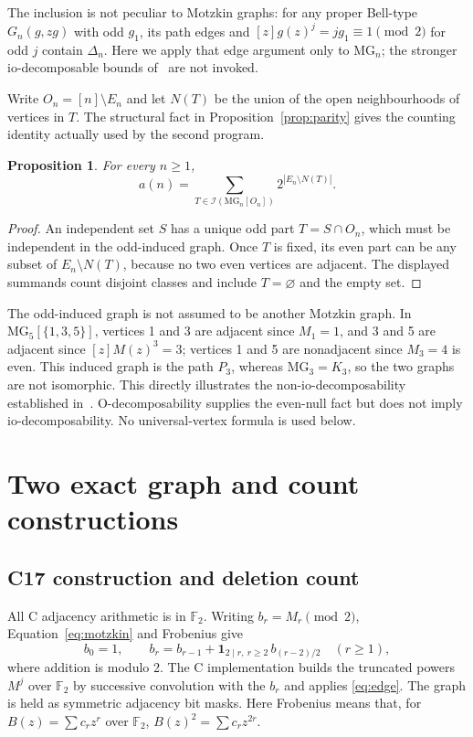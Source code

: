 \documentclass[11pt,a4paper]{article}
\newtheorem{proposition}{Proposition}[section]
\newcommand{\MG}{\mathrm{MG}}
\newcommand{\IS}{\mathcal{I}}
\begin{document}
The inclusion is not peculiar to Motzkin graphs: for any proper Bell-type
$G_n(g,zg)$ with odd $g_1$, its path edges and
$[z]g(z)^j=jg_1\equiv1\pmod{2}$ for odd $j$ contain $\Delta_n$.
Here we apply that edge argument only to $\MG_n$; the stronger
io-decomposable bounds of~\cite{counting} are not invoked.

Write $O_n=[n]\setminus E_n$ and let $N(T)$ be the union of the open
neighbourhoods of vertices in $T$.  The structural fact in
Proposition~\ref{prop:parity} gives the counting identity actually used by
the second program.
\begin{proposition}\label{prop:weighted}
For every $n\geq1$,
\begin{equation}\label{eq:weighted}
 a(n)=\sum_{T\in\IS(\MG_n[O_n])}
 2^{|E_n\setminus N(T)|}.
\end{equation}
\end{proposition}
\begin{proof}
An independent set $S$ has a unique odd part $T=S\cap O_n$, which must be
independent in the odd-induced graph.  Once $T$ is fixed, its even part can
be any subset of $E_n\setminus N(T)$, because no two even vertices are
adjacent.  The displayed summands count disjoint classes and include
$T=\varnothing$ and the empty set.
\end{proof}

The odd-induced graph is not assumed to be another Motzkin graph.
In $\MG_5[\{1,3,5\}]$, vertices 1 and 3 are adjacent since $M_1=1$,
and 3 and 5 are adjacent since $[z]M(z)^3=3$; vertices 1 and 5 are
nonadjacent since $M_3=4$ is even.  This induced graph is the path $P_3$,
whereas $\MG_3=K_3$, so the two graphs are not isomorphic.  This
directly illustrates the non-io-decomposability established
in~\cite[Example~4.8]{structure}.  O-decomposability supplies the
even-null fact but does not imply io-decomposability.  No
universal-vertex formula is used below.

\section{Two exact graph and count constructions}\label{sec:alg}
\subsection{C17 construction and deletion count}
All C adjacency arithmetic is in $\mathbb F_2$.  Writing
$b_r=M_r\pmod{2}$, Equation~\eqref{eq:motzkin} and Frobenius give
\begin{equation}\label{eq:parityrec}
 b_0=1,\qquad
 b_r=b_{r-1}+\mathbf1_{2\mid r,\ r\geq2}\,b_{(r-2)/2}
 \quad(r\geq1),
\end{equation}
where addition is modulo 2.  The C implementation builds the truncated
powers $M^j$ over $\mathbb F_2$ by successive convolution with the $b_r$ and applies
\eqref{eq:edge}.  The graph is held as symmetric adjacency bit masks.
Here Frobenius means that, for $B(z)=\sum c_rz^r$ over $\mathbb F_2$,
$B(z)^2=\sum c_rz^{2r}$.
\end{document}
